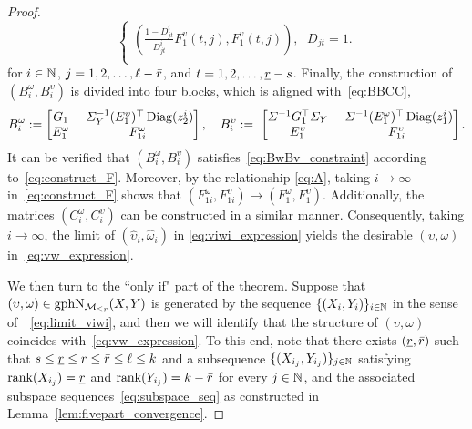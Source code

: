 \begin{proof}
\begin{equation}
\begin{cases}
        	\left( \frac{1-D_{jt}^{i}}{D_{jt}^{i}}F_{1}^{v}\left( t,j \right) ,F_{1}^{v}\left( t,j \right) \right) ,\ \ \,    D_{jt}=1.\\
        \end{cases}
    \end{equation}
    for $i\in\mathbb{N}$, $j=1,2,\ldots,\ell-\bar{r}$, and $t=1,2,\ldots,{\underline{r}}-s$. Finally, the construction of $(B^\omega_i,B^\upsilon_i)$ is divided into four blocks, which is aligned with~\eqref{eq:BBCC},
    \begin{equation*}
        B_i^{\omega}:=\left[ \begin{matrix}
	G_1&		\ \varSigma^{-1}_Y(E^\upsilon_1)^\top\Diag(z_2^i)\\
	E_{1}^{\omega}&		F_{1i}^{\omega}\\
        \end{matrix} \right],\ \ \  B_i^{\upsilon}:=\,\,\left[ \begin{matrix}
        	\varSigma ^{-1}G_{1}^{\top}\varSigma _Y&		\ \varSigma^{-1}(E^\omega_1)^\top\Diag(z^i_1)\\
        	E_{1}^{\upsilon}&		F_{1i}^{\upsilon}\\
        \end{matrix} \right].
    \end{equation*}
    It can be verified that $(B^\omega_i,B^\upsilon_i)$ satisfies~\eqref{eq:BwBv_constraint} according to~\eqref{eq:construct_F}. Moreover, by the relationship \eqref{eq:A}, taking $i\to\infty$ in~\eqref{eq:construct_F} shows that $\left( F_{1i}^{\omega} ,F_{1i}^{\upsilon} \right) \to (F_{1}^{\omega} ,F_{1}^{\upsilon})$. Additionally, the matrices $(C_i^\omega,C^\upsilon_i)$ can be constructed in a similar manner. Consequently, taking $i\to\infty$, the limit of $(\hat{\upsilon}_i,\hat{\omega}_i)$ in \eqref{eq:viwi_expression} yields the desirable $(\upsilon,\omega)$ in~\eqref{eq:vw_expression}.

    We then turn to the ``only if" part of the theorem. Suppose that $(\upsilon,\omega)\in\mathrm{gph}\mathrm{N}_{\mathcal{M}_{\le r}}(X,Y)$ is generated by the sequence $\{(X_i,Y_i)\}_{i\in\mathbb{N}}$ in the sense of~~\eqref{eq:limit_viwi}, and then we will identify that the structure of $(\upsilon,\omega)$ coincides with~\eqref{eq:vw_expression}. To this end, note that there exists $({\underline{r}},\bar{r})$ such that $s\le {\underline{r}}\le r\le \bar{r}\le\ell\le k$ and a subsequence $\{(X_{i_j},Y_{i_j})\}_{j\in\mathbb{N}}$ satisfying $\operatorname{rank}(X_{i_j})={\underline{r}}$ and $\operatorname{rank}(Y_{i_j})=k-\bar{r}$ for every $j\in\mathbb{N}$, and the associated subspace sequences~\eqref{eq:subspace_seq} as constructed in Lemma~\ref{lem:fivepart_convergence}. 


\end{proof}
